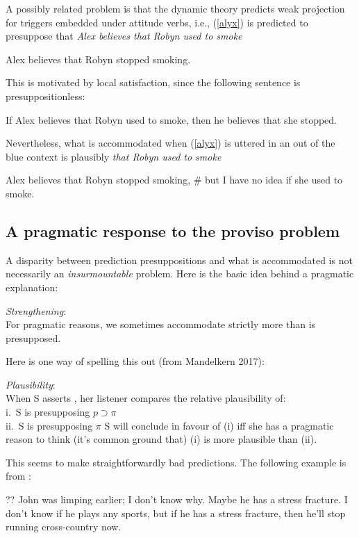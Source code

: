 \documentclass[cronos,landscape,paper=letter]{ling-handout}
\begin{document}
A possibly related problem is that the dynamic theory predicts weak projection for triggers embedded under attitude verbs, i.e., (\ref{alyx}) is predicted to presuppose that \textit{Alex believes that Robyn used to smoke}

\ex\label{alyx}Alex believes that Robyn stopped smoking.
\xe

This is motivated by local satisfaction, since the following sentence is presuppositionless:

\ex
If Alex believes that Robyn used to smoke, then he believes that she stopped.
\xe

Nevertheless, what is accommodated when (\ref{alyx}) is uttered in an out of the blue context is plausibly \textit{that Robyn used to smoke}

\ex
Alex believes that Robyn stopped smoking, \# but I have no idea if she used to smoke.
\xe

\subsection{A pragmatic response to the proviso problem}

A disparity between prediction presuppositions and what is accommodated is not necessarily an \textit{insurmountable} problem. Here is the basic idea behind a pragmatic explanation:

\ex
\textit{Strengthening}:\\
For pragmatic reasons, we sometimes accommodate strictly more than is presupposed.
\xe

Here is one way of spelling this out (from Mandelkern 2017):

\pex
\textit{Plausibility}:\\
\a When S asserts , her listener compares the relative plausibility of:\\
i. S is presupposing \(p ⊃ π\)\\
ii. S is presupposing \(π\)
\a S will conclude in favour of (i) iff she has a pragmatic reason to think (it's common ground that) (i) is more plausible than (ii).
\xe

This seems to make straightforwardly bad predictions. The following example is from \citet{mandelkern2016}:

\ex
?? John was limping earlier; I don't know why. Maybe he has a stress fracture. I don't know if he plays any sports, but if he has a stress fracture, then he'll stop running cross-country now.
\xe
\end{document}
